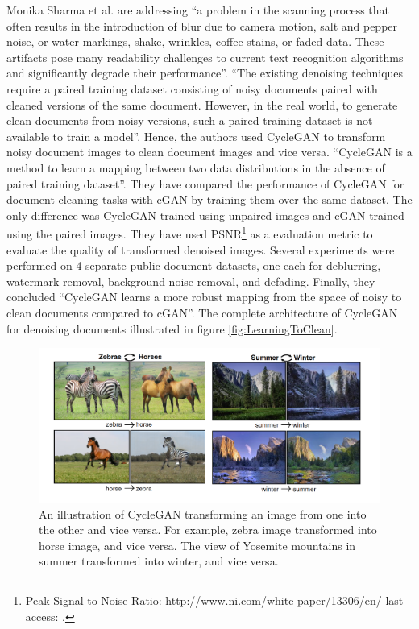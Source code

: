 Monika Sharma et al.\cite{sharma2019learning} are addressing ``a problem in the scanning process that often results in the introduction of blur due to camera motion, salt and pepper noise, or water markings, shake, wrinkles, coffee stains, or faded data. These artifacts pose many readability challenges to current text recognition algorithms and significantly degrade their performance''\cite{sharma2019learning}. ``The existing denoising techniques require a paired training dataset consisting of noisy documents paired with cleaned versions of the same document. However, in the real world, to generate clean documents from noisy versions, such a paired training dataset is not available to train a model''\cite{zhu2020unpaired}\cite{sharma2019learning}. Hence, the authors used \ac{CycleGAN} to transform noisy document images to clean document images and vice versa\cite{zhu2020unpaired}. ``\ac{CycleGAN} is a method to learn a mapping between two data distributions in the absence of paired training dataset''\cite{zhu2020unpaired}\cite{sharma2019learning}. They have compared the performance of \ac{CycleGAN} for document cleaning tasks with \ac{cGAN} by training them over the same dataset. The only difference was \ac{CycleGAN} trained using unpaired images and \ac{cGAN} trained using the paired images. They have used \ac{PSNR}\footnote{Peak Signal-to-Noise Ratio: \url{http://www.ni.com/white-paper/13306/en/} last access: \dcdate.} as a evaluation metric to evaluate the quality of transformed denoised images. Several experiments were performed on 4 separate public document datasets, one each for deblurring, watermark removal, background noise removal, and defading. Finally, they concluded ``\ac{CycleGAN} learns a more robust mapping from the space of noisy to clean documents compared to \ac{cGAN}''\cite{sharma2019learning}. The complete architecture of \ac{CycleGAN} for denoising documents illustrated in figure \ref{fig:LearningToClean}.


\begin{figure}[H]
        \begin{center}
 	    \includegraphics[scale=0.35]{images/relatedWorks/CycleGANExamples.png}
	    \caption[An illustration of \ac{CycleGAN} transforming an image from one into the other and vice versa.]{An illustration of \ac{CycleGAN} transforming an image from one into the other and vice versa. For example, zebra image transformed into horse image, and vice versa. The view of Yosemite mountains in summer transformed into winter, and vice versa\cite{zhu2020unpaired}.}
	    \label{fig:CycleganExamples}
	    \end{center}
\end{figure}


